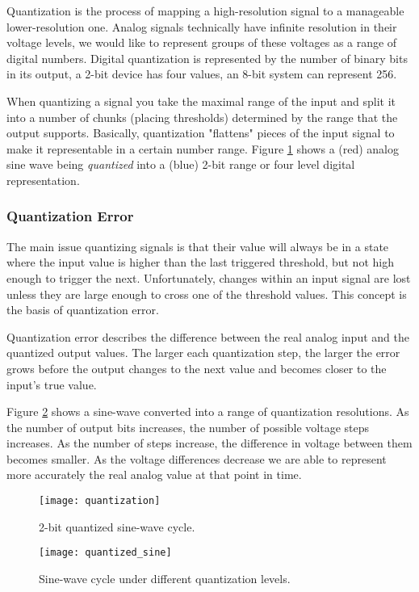 \documentclass[openany,11pt,fleqn]{book} %
\begin{document}
Quantization is the process of mapping a high-resolution signal to a manageable lower-resolution one. Analog signals technically have infinite resolution in their voltage levels, we would like to represent groups of these voltages as a range of digital numbers. Digital quantization is represented by the number of binary bits in its output, a 2-bit device has four values, an 8-bit system can represent 256. 

When quantizing a signal you take the maximal range of the input and split it into a number of chunks (placing thresholds) determined by the range that the output supports. Basically, quantization "flattens" pieces of the input signal to make it representable in a certain number range. Figure \ref{quantization} shows a (red) analog sine wave being \textit{quantized} into a (blue) 2-bit range or four level digital representation.  


\subsubsection{Quantization Error}
The main issue quantizing signals is that their value will always be in a state where the input value is higher than the last triggered threshold, but not high enough to trigger the next. Unfortunately, changes within an input signal are lost unless they are large enough to cross one of the threshold values. This concept is the basis of quantization error. 

Quantization error describes the difference between the real analog input and the quantized output values. The larger each quantization step, the larger the error grows before the output changes to the next value and becomes closer to the input's true value. 

Figure \ref{quantized_sine} shows a sine-wave converted into a range of quantization resolutions. As the number of output bits increases, the number of possible voltage steps increases. As the number of steps increase, the difference in voltage between them becomes smaller. As the voltage differences decrease we are able to represent more accurately the real analog value at that point in time.

\begin{figure}[]
    \centering\texttt{[image: quantization]}
    \caption{2-bit quantized sine-wave cycle.}
    \label{quantization}
\end{figure}

\begin{figure}[]
    \centering\texttt{[image: quantized\_sine]}
    \caption{Sine-wave cycle under different quantization levels.}
    \label{quantized_sine}
\end{figure}
\end{document}
